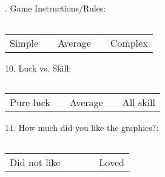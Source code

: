 . Game Instructions/Rules:
\begin{center}
 	\begin{tabular}{| p{1cm} | p{1cm} | p{1cm} | p{1cm} | p{1cm} |}
    	\hline
     	&  &  &  &  \\ \hline
  	\end{tabular}
\end{center}
\begin{center}
	\begin{tabular}{ >{\centering\arraybackslash}p{1cm}  >{\centering\arraybackslash}p{1cm}  >{\centering\arraybackslash}p{1cm}  >{\centering\arraybackslash}p{1cm}  >{\centering\arraybackslash}p{1cm} }
    Simple &  & Average &  & Complex \\ 
 	\end{tabular}
\end{center}

10. Luck vs. Skill:
\begin{center}
 	\begin{tabular}{| p{1cm} | p{1cm} | p{1cm} | p{1cm} | p{1cm} |}
    	\hline
     	&  &  &  &  \\ \hline
  	\end{tabular}
\end{center}
\begin{center}
	\begin{tabular}{ >{\centering\arraybackslash}p{1cm}  >{\centering\arraybackslash}p{1cm}  >{\centering\arraybackslash}p{1cm}  >{\centering\arraybackslash}p{1cm}  >{\centering\arraybackslash}p{1cm} }
    Pure luck &  & Average &  & All skill \\ 
 	\end{tabular}
\end{center}

11. How much did you like the graphics?:
\begin{center}
 	\begin{tabular}{| p{1cm} | p{1cm} | p{1cm} | p{1cm} | p{1cm} |}
    	\hline
     	&  &  &  &  \\ \hline
  	\end{tabular}
\end{center}
\begin{center}
	\begin{tabular}{ >{\centering\arraybackslash}p{1cm}  >{\centering\arraybackslash}p{1cm}  >{\centering\arraybackslash}p{1cm}  >{\centering\arraybackslash}p{1cm}  >{\centering\arraybackslash}p{1cm} }
    Did not like &  &  &  & Loved \\ 
 	\end{tabular}
\end{center}

